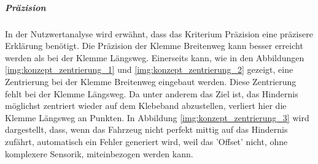 \documentclass[../main.tex]{subfiles}
\begin{document}
        \begin{table}[H]
            \caption{Nutzwertanalyse Hindernis Aufnahme}
            \label{tab:konzept_nutzwertanalyse_aufnahme}
        \end{table}

        \newpage
            
            \subparagraph{Präzision}

            In der Nutzwertanalyse wird erwähnt, dass das Kriterium Präzision eine präzisere Erklärung benötigt. Die Präzision der Klemme Breitenweg kann besser erreicht werden als bei der Klemme Längsweg. Einerseits kann, wie in den Abbildungen \ref{img:konzept_zentrierung_1} und \ref{img:konzept_zentrierung_2} gezeigt, eine Zentrierung bei der Klemme Breitenweg eingebaut werden. Diese Zentrierung fehlt bei der Klemme Längsweg. Da unter anderem das Ziel ist, das Hindernis möglichst zentriert wieder auf dem Klebeband abzustellen, verliert hier die Klemme Längsweg an Punkten. In Abbildung \ref{img:konzept_zentrierung_3} wird dargestellt, dass, wenn das Fahrzeug nicht perfekt mittig auf das Hindernis zufährt, automatisch ein Fehler generiert wird, weil das 'Offset' nicht, ohne komplexere Sensorik, miteinbezogen werden kann.
\end{document}
